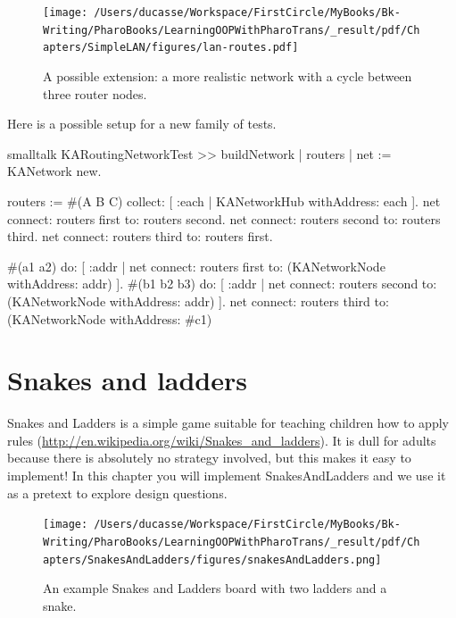 \documentclass[10pt,twoside,english]{_support/latex/sbabook/sbabook}
\begin{document}
\begin{figure}

\begin{center}
\texttt{[image: /Users/ducasse/Workspace/FirstCircle/MyBooks/Bk-Writing/PharoBooks/LearningOOPWithPharoTrans/\_result/pdf/Chapters/SimpleLAN/figures/lan-routes.pdf]}\caption{A possible extension: a more realistic network with a cycle between three router nodes. \label{routing}}\end{center}
\end{figure}


Here is a possible setup for a new family of tests. 

\begin{displaycode}{smalltalk}
KARoutingNetworkTest >> buildNetwork
    | routers |
    net := KANetwork new.

    routers := #(A B C) collect:
        [ :each | KANetworkHub withAddress: each ].
    net connect: routers first to: routers second.
    net connect: routers second to: routers third.
    net connect: routers third to: routers first.

    #(a1 a2) do: [ :addr |
        net connect: routers first
            to: (KANetworkNode withAddress: addr) ].
    #(b1 b2 b3) do: [ :addr |
        net connect: routers second
            to: (KANetworkNode withAddress: addr) ].
    net connect: routers third
        to: (KANetworkNode withAddress: #c1)
\end{displaycode}

\chapter{Snakes and ladders}\label{cha:snakes}
Snakes and Ladders is a simple game suitable for teaching children how to apply rules (\url{http://en.wikipedia.org/wiki/Snakes_and_ladders}). It is dull for adults because there is absolutely no strategy involved, but this makes it easy to implement! 
In this chapter you will implement SnakesAndLadders and we use it as a pretext to explore design questions.


\begin{figure}

\begin{center}
\texttt{[image: /Users/ducasse/Workspace/FirstCircle/MyBooks/Bk-Writing/PharoBooks/LearningOOPWithPharoTrans/\_result/pdf/Chapters/SnakesAndLadders/figures/snakesAndLadders.png]}\caption{An example Snakes and Ladders board with two ladders and a snake.\label{fig:snakes}}\end{center}
\end{figure}
\end{document}
